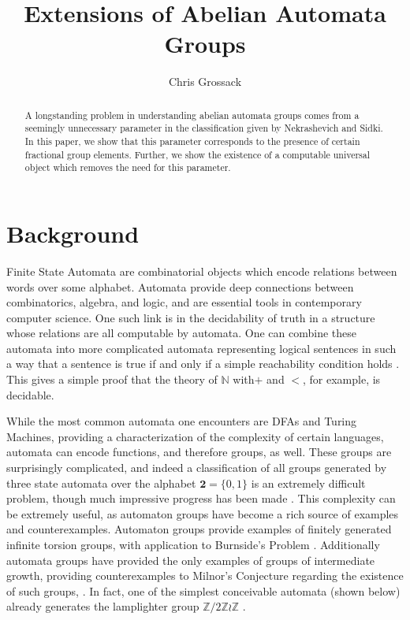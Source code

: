\documentclass[runningheads]{llncs}
\title{Extensions of Abelian Automata Groups}
\author{Chris Grossack}
\newcommand{\Z}{\mathbb{Z}}
\newcommand{\2}{\textbf{2}}
\begin{document}
\maketitle

\begin{abstract}
  A longstanding problem in understanding abelian automata groups
  comes from a seemingly unnecessary parameter in the classification
  given by Nekrashevich and Sidki. In this paper, we show that
  this parameter corresponds to the presence of certain fractional group
  elements. Further, we show the existence of a computable universal object 
  which removes the need for this parameter. 
\end{abstract}

\section{Background}
Finite State Automata are combinatorial objects which encode relations 
between words over some alphabet. Automata provide deep connections between
combinatorics, algebra, and logic, and are essential tools in contemporary 
computer science. One such link is in the decidability of truth in a structure
whose relations are all computable by automata. One can combine these automata 
into more complicated automata representing logical sentences in such a way 
that a sentence is true if and only if a simple reachability condition holds%
\cite{Brny07:automatic_structures}. This gives a simple proof that the theory 
of $\mathbb{N}$ with$+$ and $<$, for example, is decidable.

While the most common automata one encounters are DFAs
and Turing Machines, providing a characterization of the complexity of 
certain languages, automata can encode functions, and therefore groups,
as well. These groups are surprisingly complicated, and indeed a 
classification of all groups generated by three state automata over the 
alphabet $\2 = \{0,1\}$ is an extremely difficult problem, though much
impressive progress has been made \cite{Bondarenko09:three_state}. This
complexity can be extremely useful, as automaton groups have become a rich
source of examples and counterexamples. Automaton groups provide examples of
finitely generated infinite torsion groups, with application to 
Burnside's Problem \cite{Gupta83:burnside}. Additionally automata groups have
provided the only examples of groups of intermediate growth, providing 
counterexamples to Milnor's Conjecture regarding the existence of such groups,
\cite{Grigorchuk11:Milnor}. In fact, one of the simplest conceivable automata 
(shown below) already generates the lamplighter group $\Z/2\Z \wr \Z$%
\cite{GrigorchukZuk01:lamplighter}.
\end{document}
